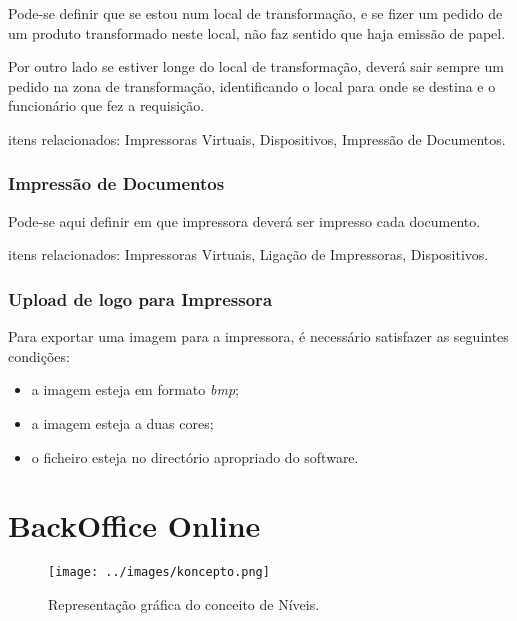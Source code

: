 \documentclass[a4paper,11pt,openany]{memoir}
\begin{document}
Pode-se definir que se estou num local de transformação, e se fizer um pedido de um produto transformado neste local,
não faz sentido que haja emissão de papel.

Por outro lado se estiver longe do local de transformação, deverá sair sempre um pedido na zona de transformação, 
identificando o local para onde se destina e o funcionário que fez a requisição.

itens relacionados: Impressoras Virtuais, Dispositivos, Impressão de Documentos.

\section{Impressão de Documentos}

Pode-se aqui definir em que impressora deverá ser impresso cada documento.

itens relacionados: Impressoras Virtuais, Ligação de Impressoras, Dispositivos.

\section{Upload de logo para Impressora}

Para exportar uma imagem para a impressora, é necessário satisfazer as seguintes condições:
\begin{itemize}
\item a imagem esteja em formato \emph{bmp};
\item a imagem  esteja a duas cores;
\item o ficheiro esteja no directório apropriado do software.
\end{itemize}















\part{BackOffice Online}

                 


\begin{figure}
\texttt{[image: ../images/koncepto.png]}
\caption[Submanifold]{Representação gráfica do conceito de Níveis.}
\end{figure}
\end{document}
